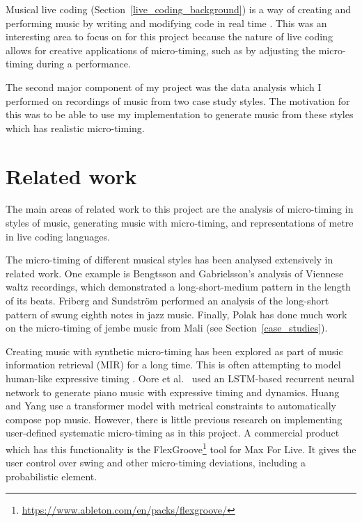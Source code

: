 \documentclass[12pt,twoside,openright]{report}
\begin{document}
Musical live coding (Section~\ref{live_coding_background}) is a way of creating and performing music by writing
and modifying code in real time \cite{magnusson2011}. This was an interesting area to focus on for
this project because the nature of live coding allows for creative applications
of micro-timing, such as by adjusting the micro-timing during a performance.

The second major component of my project was the data analysis which I performed
on recordings of music from two case study styles. The motivation for this was
to be able to use my implementation to generate music from these styles which
has realistic micro-timing.



\section{Related work} \label{related_work}

The main areas of related work to this project are the analysis of micro-timing in styles of music, generating music with micro-timing, and representations of metre in live coding languages.

The micro-timing of different musical styles has been analysed extensively in related work. One example is Bengtsson and Gabrielsson's \cite{bengtsson1977} analysis of Viennese waltz recordings, which demonstrated a long-short-medium pattern in the length of its beats. Friberg and Sundström \cite{friberg2002} performed an analysis of the long-short pattern of swung eighth notes in jazz music. Finally, Polak \cite{polak2010,london2017,jacoby2021} has done much work on the micro-timing of jembe music from Mali (see Section~\ref{case_studies}).

Creating music with synthetic micro-timing has been explored as part of music
information retrieval (MIR) for a long time. This is often attempting to model
human-like expressive timing \cite{bilmes1993}. Oore et al.\ \cite{oore2020} used an
LSTM-based recurrent neural network to generate piano music with expressive
timing and dynamics. Huang and Yang \cite{huang2020} use a transformer model with
metrical constraints to automatically compose pop music. However, there is little previous research on implementing user-defined systematic micro-timing as in this project. A commercial product which has this functionality is the FlexGroove\footnote{\url{https://www.ableton.com/en/packs/flexgroove/}} tool for Max For Live. It gives the user
control over swing and other micro-timing deviations, including a probabilistic
element.
\end{document}
